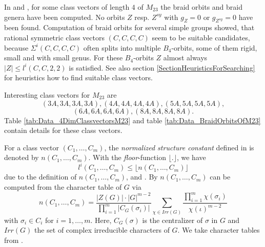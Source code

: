 \documentclass[12pt,a4paper]{article}
\numberwithin{equation}{section}
\numberwithin{table}{section}
\begin{document}
In \cite{RefHae1987} and \cite{RefHae1991}, for some class vectors of length $4$ of $M_{23}$
the braid orbits and braid genera have been computed. No orbits $Z$ resp. $Z^{sy}$ with $g_Z=0$ or $g_{Z^{sy}}=0$
have been found.
Computation of braid orbits for several simple groups showed, that rational symmetric class vectors $(C,C,C,C)$
seem to be suitable candidates, because $\Sigma^i(C,C,C,C)$ often splits into multiple $B_4$-orbits,
some of them rigid, small and with small genus.
For these $B_4$-orbits $Z$ almost always $ \vert Z \vert  \leq l^i(C,C,2,2)$ is satisfied.
See also section \ref{SectionHeuristicsForSearching} for heuristics how to find suitable class vectors.
\par
\noindent
Interesting class vectors for $M_{23}$ are 
$$(3A,3A,3A,3A),(4A,4A,4A,4A),(5A,5A,5A,5A),$$
$$(6A,6A,6A,6A),(8A,8A,8A,8A).$$
Table \ref{tab:Data_4DimClassvectorsM23} and table \ref{tab:Data_BraidOrbitsOfM23} contain details
for these class vectors.
\par
\noindent
For a class vector $(C_1,\dots, C_m)$, the {\it normalized structure constant} defined in
\cite[I, 5.3 (5.2)]{RefMM2018} is denoted by $n(C_1,\dots, C_m)$.
With the {\it floor}-function $\lfloor . \rfloor$, we have
$$l^i(C_1,\dots, C_m) \leq \lfloor n(C_1,\dots, C_m) \rfloor$$
due to the definition of $n(C_1,\dots, C_m)$, and \cite[I, Corollary 5.6]{RefMM2018}.
By \cite[I, Theorem 5.8]{RefMM2018} $n(C_1,\dots, C_m)$ can be computed from the character table of $G$ via
$$
n(C_1,\dots, C_m)=\frac{{\vert Z(G) \vert}\cdot{\vert G \vert}^{m-2}}
{\prod_{i=1}^m {\vert C_G(\sigma_i) \vert}} \sum\limits_{\chi \in Irr(G)}
\frac{\prod_{i=1}^m \chi(\sigma_i)}{\chi(\iota)^{m-2}}
$$
with $\sigma_i \in C_i$ for $i=1,\dots, m$. Here, $C_G(\sigma)$ is the centralizer of $\sigma$ in $G$ and
$Irr(G)$ the set of complex irreducible characters of $G$.
We take character tables from \cite{RefAtlas1985}.
%
\end{document}

